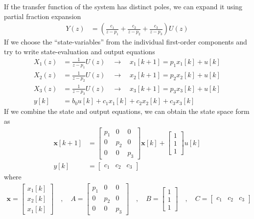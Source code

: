 \documentclass[twoside]{article}
\begin{document}
If the transfer function of the system 
has distinct poles, we can expand it 
using partial fraction expansion 
%
\begin{align*}
Y(z) &= \left( \frac{c_1}{z - p_1} + \frac{c_2}{z - p_2}
+ \frac{c_3}{z - p_3} \right) U(z)
\end{align*}
%
If we choose the ``state-variables'' from the individual 
first-order components and try to write state-evaluation and output equations
%
\begin{align*}
X_1(z) &= \frac{1}{z - p_1} U(z) \quad \rightarrow \quad x_1[k+1] = p_1
  x_1[k] + u[k]
\\
X_2(z) &= \frac{1}{z - p_2} U(z) \quad \rightarrow \quad x_2[k+1] = p_2
  x_2[k] + u[k]
\\
X_3(z) &= \frac{1}{z - p_3} U(z) \quad \rightarrow \quad x_3[k+1] = p_3
  x_3[k] + u[k]
\\
y[k] &= b_0 u[k] + c_1 x_1[k] + c_2 x_2[k] + c_3 x_3[k]
\end{align*}
%
If we combine the state and output equations, we
can obtain the state space form as
%
\begin{align*}
  \mathbf{x}[k+1] &= \left[ \begin{array}{ccc} p_1 & 0 & 0\\ 0 & p_2 & 0
    \\ 0 & 0 & p_3 \end{array} \right] \mathbf{x}[k]
   + 
  \left[ \begin{array}{c} 1 \\ 1
    \\ 1 \end{array} \right] u[k]
\\
y[k] &= \left[ \begin{array}{ccc} c_1 & c_2 & c_3 \end{array} \right]
\end{align*}
%
where 
%
\begin{align*}
\mathbf{x} = \left[ \begin{array}{c} x_1[k] \\ x_2[k] \\
x_1[k] \end{array} \right] \quad , \quad
A = \left[ \begin{array}{ccc} p_1 & 0 & 0 \\ 0 & p_2 & 0
    \\ 0 & 0 & p_3 \end{array} \right]
\quad , \quad 
B = \left[ \begin{array}{c} 1 \\ 1
    \\ 1 \end{array} \right]
\quad , \quad
C = \left[ \begin{array}{ccc} c_1 & c_2 & c_3 \end{array} \right]
\end{align*}
%
\end{document}
